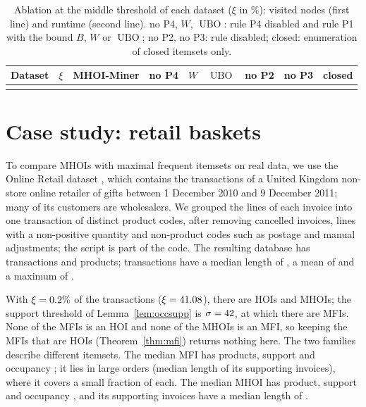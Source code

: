 \documentclass[pdflatex,sn-mathphys,Numbered]{sn-jnl}
\theoremstyle{thmstyleone}
\theoremstyle{thmstyletwo}
\theoremstyle{thmstylethree}
\newcommand{\ubo}{\operatorname{UBO}}
\newcommand{\Algo}{MHOI-Miner}
\begin{document}
\begin{table}[t]
\caption{Ablation at the middle threshold of each dataset ($\xi$ in \%): visited nodes (first line) and runtime (second line). no P4, $W$, $\ubo$: rule P4 disabled and rule P1 with the bound $B$, $W$ or $\ubo$; no P2, no P3: rule disabled; closed: enumeration of closed itemsets only.}\label{tab:ablation}
\centering
\scriptsize
\setlength{\tabcolsep}{2.4pt}
\begin{tabular}{@{}lrrrrrrrr@{}}
\toprule
Dataset & $\xi$ & \Algo{} & no P4 & $W$ & $\ubo$ & no P2 & no P3 & closed \\
\midrule
{}{ablation.tex}
\botrule
\end{tabular}
\end{table}

\section{Case study: retail baskets}\label{sec:case}

To compare MHOIs with maximal frequent itemsets on real data, we use the Online Retail dataset \cite{chen2015onlineretail,chen2012rfm}, which contains the transactions of a United Kingdom non-store online retailer of gifts between 1 December 2010 and 9 December 2011; many of its customers are wholesalers. We grouped the lines of each invoice into one transaction of distinct product codes, after removing cancelled invoices, lines with a non-positive quantity and non-product codes such as postage and manual adjustments; the script is part of the code. The resulting database has \CsTransactions{} transactions and \CsItems{} products; transactions have a median length of \CsMedLen{}, a mean of \CsAvgLen{} and a maximum of \CsMaxLen{}.

With $\xi = 0.2\%{}$ of the transactions ($\xi = 41.08{}$), there are \CsNumHOI{} HOIs and \CsNumMHOI{} MHOIs; the support threshold of Lemma~\ref{lem:occsupp} is $\sigma = 42{}$, at which there are \CsNumMFI{} MFIs. None of the MFIs is an HOI and none of the MHOIs is an MFI, so keeping the MFIs that are HOIs (Theorem~\ref{thm:mfi}) returns nothing here. The two families describe different itemsets. The median MFI has \CsMFIMedSize{} products, support \CsMFIMedSupp{} and occupancy \CsMFIMedOcc{}; it lies in large orders (median length \CsMFIMedLen{} of its supporting invoices), where it covers a small fraction of each. The median MHOI has \CsMHOIMedSize{} product, support \CsMHOIMedSupp{} and occupancy \CsMHOIMedOcc{}, and its supporting invoices have a median length of \CsMHOIMedLen{}.
\end{document}
